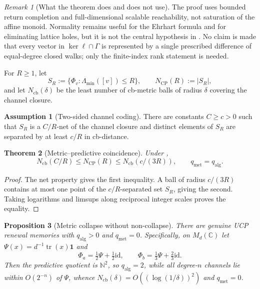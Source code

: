 \documentclass[11pt]{article}
\newtheorem{theorem}{Theorem}[section]
\newtheorem{proposition}[theorem]{Proposition}
\theoremstyle{definition}
\newtheorem{assumption}{Assumption}[section]
\theoremstyle{remark}
\newtheorem{remark}[theorem]{Remark}
\newcommand{\N}{\mathbb{N}}
\newcommand{\C}{\mathbb{C}}
\newcommand{\qalg}{q_{\mathrm{alg}}}
\newcommand{\qmet}{q_{\mathrm{met}}}
\newcommand{\Ncp}{N_{\mathrm{CP}}}
\newcommand{\Ncb}{N_{\mathrm{cb}}}
\newcommand{\id}{\mathrm{id}}
\newcommand{\tr}{\operatorname{tr}}
\newcommand{\one}{\mathbf{1}}
\begin{document}
\begin{remark}[What the theorem does and does not use]
\label{rem:return-rank-scope}
The proof uses bounded return completion and full-dimensional scalable
reachability, not saturation of the affine monoid.  Normality remains useful for
the Ehrhart formula and for eliminating lattice holes, but it is not the
central hypothesis in .  No claim is made that
every vector in \(\ker\ell\cap\Gamma\) is represented by a single prescribed
difference of equal-degree closed walks; only the finite-index rank statement is
needed.
\end{remark}

For \(R\ge1\), let
\[
 S_R:=\{\Phi_v:\Lambda_{\min}([v])\le R\},\qquad
 \Ncp(R):=|S_R|,
\]
and let \(\Ncb(\delta)\) be the least number of cb-metric balls of radius
\(\delta\) covering the channel closure.

\begin{assumption}[Two-sided channel coding]
\label{ass:two-sided-channel-coding}
There are constants \(C\ge c>0\) such that \(S_R\) is a \(C/R\)-net of the
channel closure and distinct elements of \(S_R\) are separated by at least
\(c/R\) in cb-distance.
\end{assumption}

\begin{theorem}[Metric--predictive coincidence]
\label{thm:metric-predictive-coincidence}
Under ,
\[
 \Ncb(C/R)\le\Ncp(R)\le\Ncb(c/(3R)),
 \qquad
 \boxed{\qmet=\qalg.}
\]
\end{theorem}

\begin{proof}
The net property gives the first inequality.  A ball of radius \(c/(3R)\)
contains at most one point of the \(c/R\)-separated set \(S_R\), giving the
second.  Taking logarithms and limsups along reciprocal integer scales proves
the equality.
\end{proof}

\begin{proposition}[Metric collapse without non-collapse]
\label{prop:metric-collapse}
There are genuine UCP renewal memories with \(\qalg>0\) and \(\qmet=0\).
Specifically, on \(M_d(\C)\) let \(\Psi(x)=d^{-1}\tr(x)\one\) and
\[
 \Phi_a=\tfrac12\Psi+\tfrac12\id,\qquad
 \Phi_b=\tfrac13\Psi+\tfrac23\id.
\]
Then the predictive quotient is \(\N^2\), so \(\qalg=2\), while all degree-\(n\)
channels lie within \(O(2^{-n})\) of \(\Psi\), whence
\(\Ncb(\delta)=O((\log(1/\delta))^2)\) and \(\qmet=0\).
\end{proposition}
\end{document}
